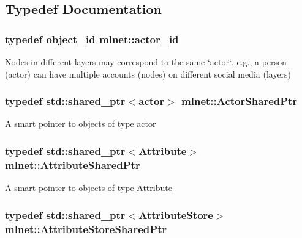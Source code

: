 \subsection{Typedef Documentation}
\hypertarget{namespacemlnet_a1d557bff46b627f1d7f6ff613302bba5}{
\subsubsection[{actor\+\_\+id}]{\setlength{\rightskip}{0pt plus 5cm}typedef {\bf object\+\_\+id} {\bf mlnet\+::actor\+\_\+id}}}\label{namespacemlnet_a1d557bff46b627f1d7f6ff613302bba5}
Nodes in different layers may correspond to the same \char`\"{}actor\char`\"{}, e.\+g., a person (actor) can have multiple accounts (nodes) on different social media (layers) \hypertarget{namespacemlnet_a714fd98ffaeaadd5c38d61fa53dc4d24}{
\subsubsection[{Actor\+Shared\+Ptr}]{\setlength{\rightskip}{0pt plus 5cm}typedef std\+::shared\+\_\+ptr$<${\bf actor}$>$ {\bf mlnet\+::\+Actor\+Shared\+Ptr}}}\label{namespacemlnet_a714fd98ffaeaadd5c38d61fa53dc4d24}
A smart pointer to objects of type actor \hypertarget{namespacemlnet_a760c8b8d6997e73350446bafff35e6d6}{
\subsubsection[{Attribute\+Shared\+Ptr}]{\setlength{\rightskip}{0pt plus 5cm}typedef std\+::shared\+\_\+ptr$<${\bf Attribute}$>$ {\bf mlnet\+::\+Attribute\+Shared\+Ptr}}}\label{namespacemlnet_a760c8b8d6997e73350446bafff35e6d6}
A smart pointer to objects of type \hyperlink{classmlnet_1_1_attribute}{Attribute} \hypertarget{namespacemlnet_a3d60b9ef6ef6489d000f6061e0a1bdf2}{
\subsubsection[{Attribute\+Store\+Shared\+Ptr}]{\setlength{\rightskip}{0pt plus 5cm}typedef std\+::shared\+\_\+ptr$<${\bf Attribute\+Store}$>$ {\bf mlnet\+::\+Attribute\+Store\+Shared\+Ptr}}}\label{namespacemlnet_a3d60b9ef6ef6489d000f6061e0a1bdf2}
